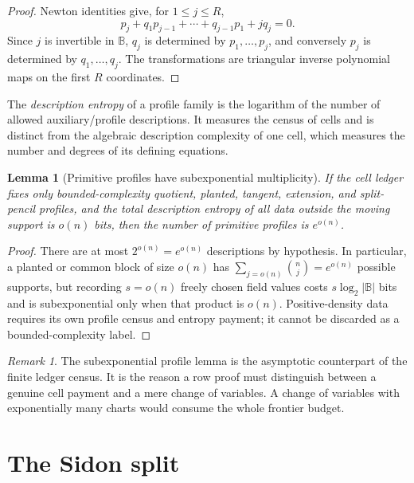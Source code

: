 \documentclass[12pt,a4paper]{amsart}
\numberwithin{equation}{section}
\newtheorem{lemma}[lemma]{Lemma}
\theoremstyle{remark}
\newtheorem{remark}[remark]{Remark}
\newcommand{\B}{\mathbb B}
\newcommand{\abs}[1]{\lvert #1\rvert}
\begin{document}
\begin{proof}
Newton identities give, for \(1\le j\le R\),
\[
        p_j+q_1p_{j-1}+\cdots+q_{j-1}p_1+jq_j=0.
\]
Since \(j\) is invertible in \(\B\), \(q_j\) is determined by \(p_1,\ldots,p_j\), and conversely \(p_j\) is determined by \(q_1,\ldots,q_j\).  The transformations are triangular inverse polynomial maps on the first \(R\) coordinates.
\end{proof}

The \emph{description entropy} of a profile family is the logarithm of the
number of allowed auxiliary/profile descriptions.  It measures the census
of cells and is distinct from the algebraic description complexity of one
cell, which measures the number and degrees of its defining equations.

\begin{lemma}[Primitive profiles have subexponential multiplicity]\label{lem:profile-multiplicity}
If the cell ledger fixes only bounded-complexity quotient, planted, tangent,
extension, and split-pencil profiles, and the total description entropy of
all data outside the moving support is \(o(n)\) bits, then the number of
primitive profiles is \(e^{o(n)}\).
\end{lemma}

\begin{proof}
There are at most \(2^{o(n)}=e^{o(n)}\) descriptions by hypothesis.  In
particular, a planted or common block of size \(o(n)\) has
\(\sum_{j=o(n)}\binom nj=e^{o(n)}\) possible supports, but recording
\(s=o(n)\) freely chosen field values costs \(s\log_2\abs\B\) bits and is
subexponential only when that product is \(o(n)\).  Positive-density data
requires its own profile census and entropy payment; it cannot be discarded
as a bounded-complexity label.
\end{proof}

\begin{remark}
The subexponential profile lemma is the asymptotic counterpart of the
finite ledger census.  It is the reason a row proof must distinguish
between a genuine cell payment and a mere change of variables.  A change
of variables with exponentially many charts would consume the whole
frontier budget.
\end{remark}

\section{The Sidon split}\label{sec:sidon-split}
\end{document}

